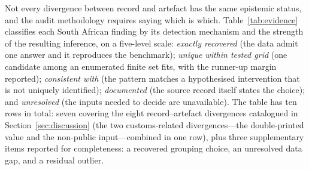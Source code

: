 Not every divergence between record and artefact has the same epistemic
status, and the audit methodology requires saying which is which.
Table~\ref{tab:evidence} classifies each South African finding by its
detection mechanism and the strength of the resulting inference, on a
five-level scale: \emph{exactly recovered} (the data admit one answer and
it reproduces the benchmark); \emph{unique within tested grid} (one
candidate among an enumerated finite set fits, with the runner-up margin
reported); \emph{consistent with} (the pattern matches a hypothesised
intervention that is not uniquely identified); \emph{documented} (the
source record itself states the choice); and \emph{unresolved} (the
inputs needed to decide are unavailable). The table has ten rows in total:
seven covering the eight record--artefact divergences catalogued in
Section~\ref{sec:discussion} (the two customs-related divergences---the
double-printed value and the non-public input---combined in one row),
plus three supplementary items reported for completeness: a recovered
grouping choice, an unresolved data gap, and a residual outlier.

